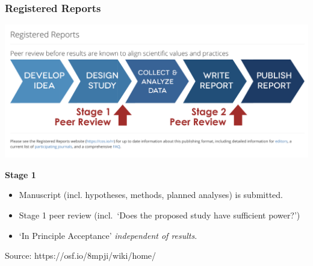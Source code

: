 \documentclass{beamer}
\begin{document}
\begin{frame}
\frametitle{Registered Reports}

\begin{center}
\includegraphics[scale=0.23]{RegRep.png}
\end{center}


\begin{large}
\textbf{Stage 1}
\begin{itemize}
\item<1-> Manuscript (incl. hypotheses, methods, planned analyses) is submitted.
\item<2-> Stage 1 peer review (incl.\ `Does the proposed study have sufficient power?') 
\item<3> `In Principle Acceptance' \textit{independent of results}. 
\end{itemize}

\end{large}




\begin{tiny}
Source: https://osf.io/8mpji/wiki/home/
\end{tiny}
\end{frame}
\end{document}
